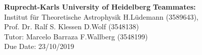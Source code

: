 \documentclass[a4paper, 11pt]{article}
\begin{document}
\large\textbf{Ruprecht-Karls University of Heidelberg} \hfill \textbf{Teammates:} \\
\normalsize Institut für Theoretische Astrophysik \hfill 
H.Lüdemann (3589643),  \\
Prof. Dr. Ralf S. Klessen \hfill  D.Wolf (3548138) \\
Tutor: Marcelo Barraza \hfill F.Wallberg (3548199)\\
Due Date: 23/10/2019 \\




\end{document}

